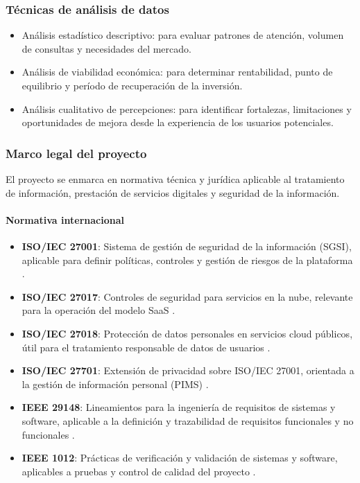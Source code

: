 \subsubsection{Técnicas de análisis de datos}
\begin{itemize}
    \item Análisis estadístico descriptivo: para evaluar patrones de atención, volumen de consultas y necesidades del mercado.

    \item Análisis de viabilidad económica: para determinar rentabilidad, punto de equilibrio y período de recuperación de la inversión.

    \item Análisis cualitativo de percepciones: para identificar fortalezas, limitaciones y oportunidades de mejora desde la experiencia de los usuarios potenciales.
\end{itemize}



\subsubsection{Marco legal del proyecto}
El proyecto se enmarca en normativa técnica y jurídica aplicable al tratamiento de información, prestación de servicios digitales y seguridad de la información.

\paragraph{Normativa internacional}
\begin{itemize}
    \item \textbf{ISO/IEC 27001}: Sistema de gestión de seguridad de la información (SGSI), aplicable para definir políticas, controles y gestión de riesgos de la plataforma \parencite{iso27001}.
    \item \textbf{ISO/IEC 27017}: Controles de seguridad para servicios en la nube, relevante para la operación del modelo SaaS \parencite{iso27017}.
    \item \textbf{ISO/IEC 27018}: Protección de datos personales en servicios cloud públicos, útil para el tratamiento responsable de datos de usuarios \parencite{iso27018}.
    \item \textbf{ISO/IEC 27701}: Extensión de privacidad sobre ISO/IEC 27001, orientada a la gestión de información personal (PIMS) \parencite{iso27701}.
    \item \textbf{IEEE 29148}: Lineamientos para la ingeniería de requisitos de sistemas y software, aplicable a la definición y trazabilidad de requisitos funcionales y no funcionales \parencite{ieee29148}.
    \item \textbf{IEEE 1012}: Prácticas de verificación y validación de sistemas y software, aplicables a pruebas y control de calidad del proyecto \parencite{ieee1012}.
\end{itemize}

